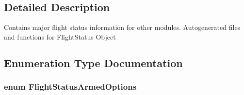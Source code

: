 \subsection{\-Detailed \-Description}
\-Contains major flight status information for other modules. \-Autogenerated files and functions for \-Flight\-Status \-Object 

\subsection{\-Enumeration \-Type \-Documentation}
\hypertarget{group___flight_status_ga5dc78ee3624e05a61abe005a977be474}{
\subsubsection[{\-Flight\-Status\-Armed\-Options}]{\setlength{\rightskip}{0pt plus 5cm}enum {\bf \-Flight\-Status\-Armed\-Options}}}\label{group___flight_status_ga5dc78ee3624e05a61abe005a977be474}
